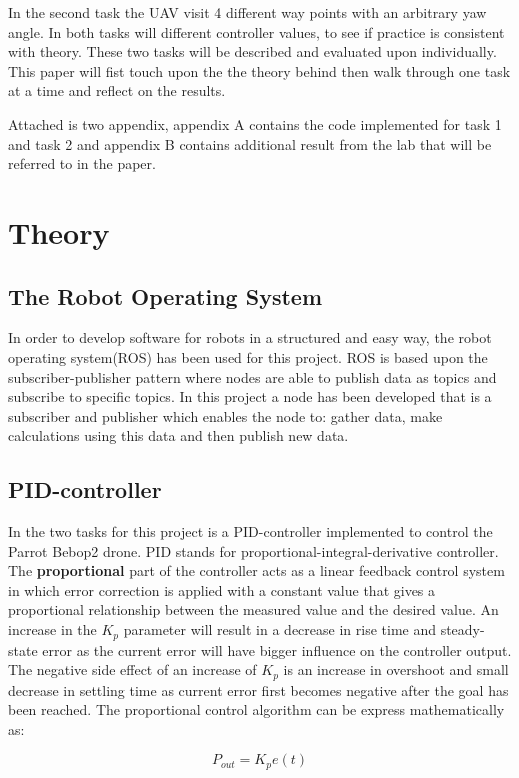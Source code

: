 \documentclass[conference]{IEEEtran}
\begin{document}
In the second task the UAV visit 4 different way points with an arbitrary yaw angle.  
In both tasks will different controller values, to see if practice is consistent with theory. These two tasks will be described and evaluated upon individually. This paper will fist touch upon the the theory behind then walk through one task at a time and reflect on the results.

Attached is two appendix, appendix A contains the code implemented for task 1 and task 2 and appendix B contains additional result from the lab that will be referred to in the paper.   

\section{Theory}\label{theory}
\subsection{The Robot Operating System}
In order to develop software for robots in a structured and easy way, the robot operating system(ROS)\cite{ros} has been used for this project. ROS is based upon the subscriber-publisher pattern where nodes are able to publish data as topics and subscribe to specific topics. In this project a node has been developed that is a subscriber and publisher which enables the node to: gather data, make calculations using this data and then publish new data. 

\subsection{PID-controller}
In the two tasks for this project is a PID-controller implemented to control the Parrot Bebop2 drone. PID stands for proportional-integral-derivative controller. The \textbf{proportional} part of the controller acts as a linear feedback control system in which error correction is applied with a constant value that gives a proportional relationship between the measured value and the desired value. An increase in the $K_p$ parameter will result in a decrease in rise time and steady-state error as the current error will have bigger influence on the controller output. The negative side effect of an increase of $K_p$ is an increase in overshoot and small decrease in settling time as current error first becomes negative after the goal has been reached. The proportional control algorithm can be express mathematically as:

\begin{equation}
P_{out} = K_p e(t) \label{eq1}
\end{equation}
\end{document}
